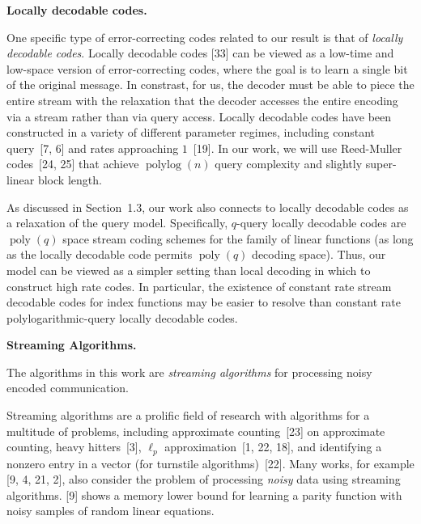 \par\medskip\noindent\textbf{Locally decodable codes.}\par




One specific type of error-correcting codes related to our result is that of \emph{locally decodable codes}. Locally decodable codes [33] can be viewed as a low-time and low-space version of error-correcting codes, where the goal is to learn a single bit of the original message. In constrast, for us, the decoder must be able to piece the entire stream with the relaxation that the decoder accesses the entire encoding via a stream rather than via query access. Locally decodable codes have been constructed in a variety of different parameter regimes, including constant query [7, 6] and rates approaching $1$ [19]. In our work, we will use Reed-Muller codes [24, 25] that achieve $\operatorname{polylog}(n)$ query complexity and slightly super-linear block length.\par




As discussed in Section 1.3, our work also connects to locally decodable codes as a relaxation of the query model. Specifically, $q$-query locally decodable codes are $\operatorname{poly}(q)$ space stream coding schemes for the family of linear functions (as long as the locally decodable code permits $\operatorname{poly}(q)$ decoding space). Thus, our model can be viewed as a simpler setting than local decoding in which to construct high rate codes. In particular, the existence of constant rate stream decodable codes for index functions may be easier to resolve than constant rate polylogarithmic-query locally decodable codes.\par





\par\medskip\noindent\textbf{Streaming Algorithms.}\par




The algorithms in this work are \emph{streaming algorithms} for processing noisy encoded communication.\par




Streaming algorithms are a prolific field of research with algorithms for a multitude of problems, including approximate counting [23] on approximate counting, heavy hitters [3], $\ell_{p}$ approximation [1, 22, 18], and identifying a nonzero entry in a vector (for turnstile algorithms) [22]. Many works, for example [9, 4, 21, 2], also consider the problem of processing \emph{noisy} data using streaming algorithms. [9] shows a memory lower bound for learning a parity function with noisy samples of random linear equations.\par




